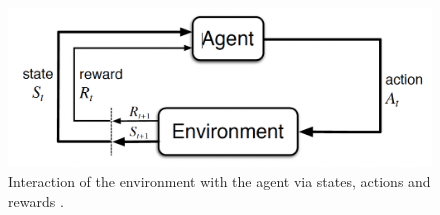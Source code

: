 \begin{figure}
	\centering
	\includegraphics[width=0.8\linewidth]{images/rl_intro.png}
	\caption{Interaction of the environment with the agent via states, actions and rewards \parencite[][p. 48]{sutton2018reinforcement}.}
	\label{fig:rl}
\end{figure}


